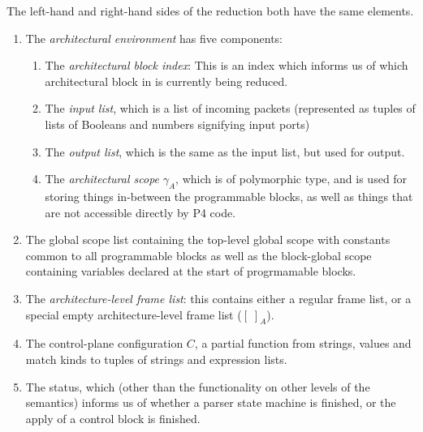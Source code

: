 \documentclass[UTF8]{article}
\begin{document}
The left-hand and right-hand sides of the reduction both have the same elements.
\begin{enumerate}
\item The \emph{architectural environment} \aenv{} has five components:
\begin{enumerate}
\item The \emph{architectural block index}: This is an index which informs us of which architectural block in \abl{} is currently being reduced.
\item The \emph{input list}, which is a list of incoming packets (represented as tuples of lists of Booleans and numbers signifying input ports)
\item The \emph{output list}, which is the same as the input list, but used for output.
\item The \emph{architectural scope} $\gamma_A$, which is of polymorphic type, and is used for storing things in-between the programmable blocks, as well as things that are not accessible directly by P4 code.
\end{enumerate}
\item The global scope list \gscopel{} containing the top-level global scope with constants common to all programmable blocks as well as the block-global scope containing variables declared at the start of progrmamable blocks.
\item The \emph{architecture-level frame list}: this contains either a regular frame list, or a special empty architecture-level frame list ($[ \; ]_A$).
\item The control-plane configuration $C$, a partial function from strings, values and match kinds to tuples of strings and expression lists.
\item The status, which (other than the functionality on other levels of the semantics) informs us of whether a parser  state machine is finished, or the apply of a control block is finished.
\end{enumerate}
\end{document}
